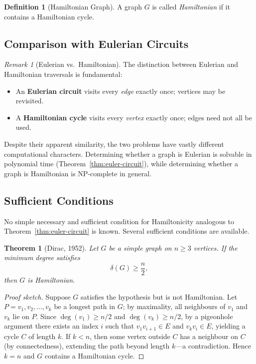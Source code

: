 \documentclass[12pt,a4paper]{article}
\theoremstyle{definition}
\newtheorem{definition}{Definition}[section]
\theoremstyle{plain}
\newtheorem{theorem}{Theorem}[section]
\theoremstyle{remark}
\newtheorem{remark}{Remark}[section]
\begin{document}
\begin{definition}[Hamiltonian Graph]\label{def:ham-graph}
A graph $G$ is called \emph{Hamiltonian} if it contains a Hamiltonian cycle.
\end{definition}

\subsection{Comparison with Eulerian Circuits}

\begin{remark}[Eulerian vs.\ Hamiltonian]\label{rem:euler-vs-ham}
The distinction between Eulerian and Hamiltonian traversals is fundamental:
\begin{itemize}
  \item An \textbf{Eulerian circuit} visits every \emph{edge} exactly once; vertices
        may be revisited.
  \item A \textbf{Hamiltonian cycle} visits every \emph{vertex} exactly once; edges
        need not all be used.
\end{itemize}
Despite their apparent similarity, the two problems have vastly different computational
characters. Determining whether a graph is Eulerian is solvable in polynomial time
(Theorem~\ref{thm:euler-circuit}), while determining whether a graph is Hamiltonian is
NP-complete in general.
\end{remark}

\subsection{Sufficient Conditions}

No simple necessary and sufficient condition for Hamiltonicity analogous to
Theorem~\ref{thm:euler-circuit} is known. Several sufficient conditions are available.

\begin{theorem}[Dirac, 1952]\label{thm:dirac}
Let $G$ be a simple graph on $n \geq 3$ vertices. If the minimum degree satisfies
\begin{equation}
  \delta(G) \geq \frac{n}{2},
\end{equation}
then $G$ is Hamiltonian.
\end{theorem}

\begin{proof}[Proof sketch]
Suppose $G$ satisfies the hypothesis but is not Hamiltonian. Let $P = v_1, v_2, \ldots,
v_k$ be a longest path in $G$; by maximality, all neighbours of $v_1$ and $v_k$ lie on
$P$. Since $\deg(v_1) \geq n/2$ and $\deg(v_k) \geq n/2$, by a pigeonhole argument
there exists an index $i$ such that $v_1 v_{i+1} \in E$ and $v_k v_i \in E$, yielding
a cycle $C$ of length $k$. If $k < n$, then some vertex outside $C$ has a neighbour on
$C$ (by connectedness), extending the path beyond length $k$---a contradiction.
Hence $k = n$ and $G$ contains a Hamiltonian cycle.
\end{proof}
\end{document}
